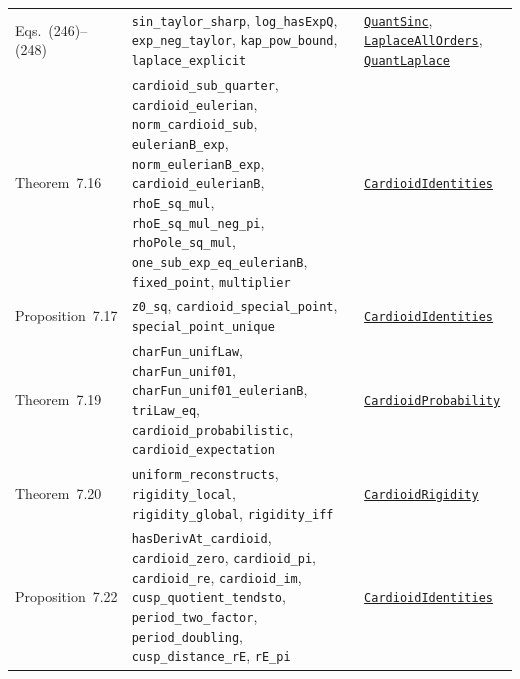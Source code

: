 \documentclass[11pt,a4paper]{article}
\newcommand{\R}{https://github.com/ralfanop/Certifications_Eulerian_polar-curve_computations}
\newcommand{\A}{\R/blob/main/certifications/manuscript15}
\begin{document}
{\begin{longtable}{@{}>{\raggedright\arraybackslash}p{}>{\raggedright\arraybackslash}p{}>{\raggedright\arraybackslash}p{}@{}}
Eqs.~(246)--(248) & \texttt{sin\_\allowbreak taylor\_\allowbreak sharp}, \texttt{log\_\allowbreak hasExpQ}, \texttt{exp\_\allowbreak neg\_\allowbreak taylor}, \texttt{kap\_\allowbreak pow\_\allowbreak bound}, \texttt{laplace\_\allowbreak explicit} & \href{\A/LEAN/PrivateApex/QuantSinc.lean}{\texttt{QuantSinc}}, \href{\A/LEAN/PrivateApex/LaplaceAllOrders.lean}{\texttt{LaplaceAllOrders}}, \href{\A/LEAN/PrivateApex/QuantLaplace.lean}{\texttt{QuantLaplace}}\\
Theorem~7.16 & \texttt{cardioid\_\allowbreak sub\_\allowbreak quarter}, \texttt{cardioid\_\allowbreak eulerian}, \texttt{norm\_\allowbreak cardioid\_\allowbreak sub}, \texttt{eulerianB\_\allowbreak exp}, \texttt{norm\_\allowbreak eulerianB\_\allowbreak exp}, \texttt{cardioid\_\allowbreak eulerianB}, \texttt{rhoE\_\allowbreak sq\_\allowbreak mul}, \texttt{rhoE\_\allowbreak sq\_\allowbreak mul\_\allowbreak neg\_\allowbreak pi}, \texttt{rhoPole\_\allowbreak sq\_\allowbreak mul}, \texttt{one\_\allowbreak sub\_\allowbreak exp\_\allowbreak eq\_\allowbreak eulerianB}, \texttt{fixed\_\allowbreak point}, \texttt{multiplier} & \href{\A/LEAN/PrivateApex/CardioidIdentities.lean}{\texttt{CardioidIdentities}}\\
Proposition~7.17 & \texttt{z0\_\allowbreak sq}, \texttt{cardioid\_\allowbreak special\_\allowbreak point}, \texttt{special\_\allowbreak point\_\allowbreak unique} & \href{\A/LEAN/PrivateApex/CardioidIdentities.lean}{\texttt{CardioidIdentities}}\\
Theorem~7.19 & \texttt{charFun\_\allowbreak unifLaw}, \texttt{charFun\_\allowbreak unif01}, \texttt{charFun\_\allowbreak unif01\_\allowbreak eulerianB}, \texttt{triLaw\_\allowbreak eq}, \texttt{cardioid\_\allowbreak probabilistic}, \texttt{cardioid\_\allowbreak expectation} & \href{\A/LEAN/PrivateApex/CardioidProbability.lean}{\texttt{CardioidProbability}}\\
Theorem~7.20 & \texttt{uniform\_\allowbreak reconstructs}, \texttt{rigidity\_\allowbreak local}, \texttt{rigidity\_\allowbreak global}, \texttt{rigidity\_\allowbreak iff} & \href{\A/LEAN/PrivateApex/CardioidRigidity.lean}{\texttt{CardioidRigidity}}\\
Proposition~7.22 & \texttt{hasDerivAt\_\allowbreak cardioid}, \texttt{cardioid\_\allowbreak zero}, \texttt{cardioid\_\allowbreak pi}, \texttt{cardioid\_\allowbreak re}, \texttt{cardioid\_\allowbreak im}, \texttt{cusp\_\allowbreak quotient\_\allowbreak tendsto}, \texttt{period\_\allowbreak two\_\allowbreak factor}, \texttt{period\_\allowbreak doubling}, \texttt{cusp\_\allowbreak distance\_\allowbreak rE}, \texttt{rE\_\allowbreak pi} & \href{\A/LEAN/PrivateApex/CardioidIdentities.lean}{\texttt{CardioidIdentities}}\\

\end{longtable}}
\end{document}
